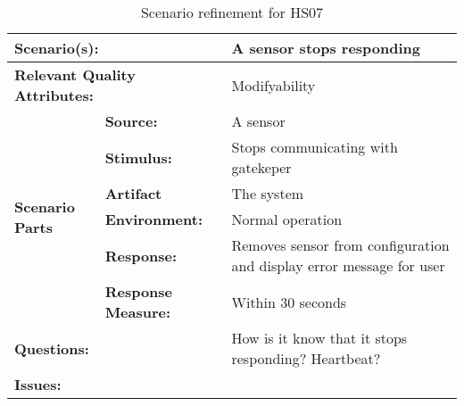 \documentclass[10pt,a4paper]{article}
\begin{document}
\begin{table}[!htp]
\begin{center}
\begin{tabular}{|p{0.3cm}|p{2.5cm}|p{8cm}|}
  \hline
  \multicolumn{2}{|p{3cm}|}{\bfseries Scenario(s):} & A sensor stops responding \\
  \hline
  \multicolumn{2}{|p{3cm}|}{\bfseries Relevant Quality Attributes:} & Modifyability \\
  \hline
  \multirow{6}{*}{\begin{sideways}{\bfseries Scenario Parts}\end{sideways}}
  & {\bfseries Source:} & A sensor \\
  \cline{2-3}
  & {\bfseries Stimulus:} & Stops communicating with gatekeper \\
  \cline{2-3}
  & {\bfseries Artifact} & The system \\
  \cline{2-3}
  & {\bfseries Environment:} & Normal operation \\
  \cline{2-3}
  & {\bfseries Response:} & Removes sensor from configuration and display error message for user \\
  \cline{2-3}
  & {\bfseries Response Measure:} & Within 30 seconds \\
  \hline
  \multicolumn{2}{|p{3cm}|}{\bfseries Questions:} & How is it know that it stops responding? Heartbeat? \\
  \hline
  \multicolumn{2}{|p{3cm}|}{\bfseries Issues:} &  \\
  \hline
\end{tabular}
\caption{Scenario refinement for HS07}
\end{center}
\end{table}
\end{document}
